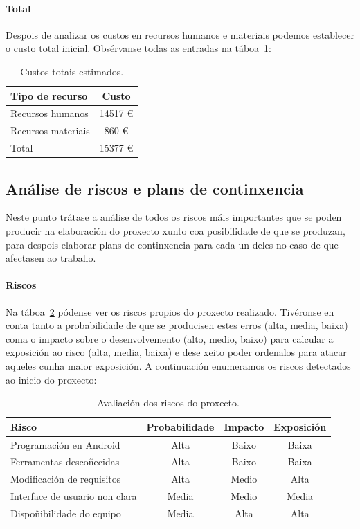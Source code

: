 \paragraph{Total}
Despois de analizar os custos en recursos humanos e materiais podemos establecer o custo total inicial. Obsérvanse todas as entradas na táboa~\ref{tab:custoTotalEstimado}:

\begin{table} [tbh]
	\footnotesize
	\centering
	\begin{tabular}{|l|c|}
		\hline 
		\textbf{Tipo de recurso} & \textbf{Custo} \\ 
		\hline 
		Recursos humanos & 14517 € \\ 
		\hline 
		Recursos materiais & 860 € \\ 
		\hline 
		Total & 15377 € \\ 
		\hline 
	\end{tabular}
	\caption{Custos totais estimados.}
	\label{tab:custoTotalEstimado}
\end{table}

\subsection{Análise de riscos e plans de continxencia}
Neste punto trátase a análise de todos os riscos máis importantes que se poden producir na elaboración do proxecto xunto coa posibilidade de que se produzan, para despois elaborar plans de continxencia para cada un deles no caso de que afectasen ao traballo.

\paragraph{Riscos}
Na táboa~\ref{tab:riscos} pódense ver os riscos propios do proxecto realizado. Tivéronse en conta tanto a probabilidade de que se producisen estes erros (alta, media, baixa) coma o impacto sobre o desenvolvemento (alto, medio, baixo) para calcular a exposición ao risco (alta, media, baixa) e dese xeito poder ordenalos para atacar aqueles cunha maior exposición.
A continuación enumeramos os riscos detectados ao inicio do proxecto:

\begin{table} [tbh]
	\footnotesize
	\centering
	\begin{tabular}{|l|c|c|c|}
		\hline 
		\textbf{Risco} & \textbf{Probabilidade} & \textbf{Impacto} & \textbf{Exposición} \\ 
		\hline 
		Programación en Android & Alta & Baixo & Baixa \\ 
		\hline 
		Ferramentas descoñecidas & Alta & Baixo & Baixa \\ 
		\hline 
		Modificación de requisitos & Alta & Medio & Alta \\ 
		\hline 
		Interface de usuario non clara & Media & Medio & Media \\ 
		\hline 
		Dispoñibilidade do equipo & Media & Alta & Alta \\ 
		\hline 
	\end{tabular}
	\caption{Avaliación dos riscos do proxecto.}
	\label{tab:riscos}
\end{table}

